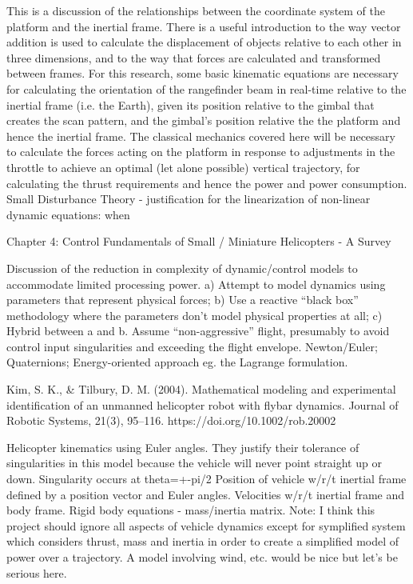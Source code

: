 \documentclass[10pt]{article}
\begin{document}
This is a discussion of the relationships between the coordinate system of the platform and the inertial frame. There is a useful introduction to the way vector addition is used to calculate the displacement of objects relative to each other in three dimensions, and to the way that forces are calculated and transformed between frames. 
For this research, some basic kinematic equations are necessary for calculating the orientation of the rangefinder beam in real-time relative to the inertial frame (i.e. the Earth), given its position relative to the gimbal that creates the scan pattern, and the gimbal’s position relative the the platform and hence the inertial frame. 
The classical mechanics covered here will be necessary to calculate the forces acting on the platform in response to adjustments in the throttle to achieve an optimal (let alone possible) vertical trajectory, for calculating the thrust requirements and hence the power and power consumption.
Small Disturbance Theory - justification for the linearization of non-linear dynamic equations: when 

Chapter 4: Control Fundamentals of Small / Miniature Helicopters - A Survey

Discussion of the reduction in complexity of dynamic/control models to accommodate limited processing power. 
a) Attempt to model dynamics using parameters that represent physical forces; b) Use a reactive “black box” methodology where the parameters don’t model physical properties at all; c) Hybrid between a and b.
Assume “non-aggressive” flight, presumably to avoid control input singularities and exceeding the flight envelope.
Newton/Euler; Quaternions; Energy-oriented approach eg. the Lagrange formulation.

\cite{Kim2004}
Kim, S. K., \& Tilbury, D. M. (2004). Mathematical modeling and experimental identification of an unmanned helicopter robot with flybar dynamics. Journal of Robotic Systems, 21(3), 95–116. https://doi.org/10.1002/rob.20002

Helicopter kinematics using Euler angles. They justify their tolerance of singularities in this model because the vehicle will never point straight up or down. Singularity occurs at theta=+-pi/2
Position of vehicle w/r/t inertial frame defined by a position vector and Euler angles.
Velocities w/r/t inertial frame and body frame.
Rigid body equations - mass/inertia matrix.
Note: I think this project should ignore all aspects of vehicle dynamics except for symplified system which considers thrust, mass and inertia in order to create a simplified model of power over a trajectory. A model involving wind, etc. would be nice but let’s be serious here.
\end{document}
